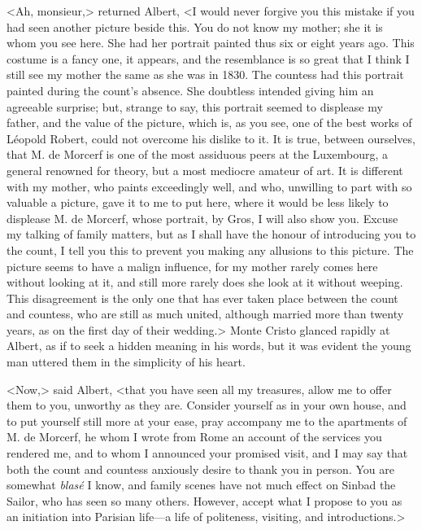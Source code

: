  <Ah, monsieur,> returned Albert, <I would never forgive you this mistake if you had seen another picture beside this. You do not know my mother; she it is whom you see here. She had her portrait painted thus six or eight years ago. This costume is a fancy one, it appears, and the resemblance is so great that I think I still see my mother the same as she was in 1830. The countess had this portrait painted during the count's absence. She doubtless intended giving him an agreeable surprise; but, strange to say, this portrait seemed to displease my father, and the value of the picture, which is, as you see, one of the best works of Léopold Robert, could not overcome his dislike to it. It is true, between ourselves, that M. de Morcerf is one of the most assiduous peers at the Luxembourg, a general renowned for theory, but a most mediocre amateur of art. It is different with my mother, who paints exceedingly well, and who, unwilling to part with so valuable a picture, gave it to me to put here, where it would be less likely to displease M. de Morcerf, whose portrait, by Gros, I will also show you. Excuse my talking of family matters, but as I shall have the honour of introducing you to the count, I tell you this to prevent you making any allusions to this picture. The picture seems to have a malign influence, for my mother rarely comes here without looking at it, and still more rarely does she look at it without weeping. This disagreement is the only one that has ever taken place between the count and countess, who are still as much united, although married more than twenty years, as on the first day of their wedding.>  Monte Cristo glanced rapidly at Albert, as if to seek a hidden meaning in his words, but it was evident the young man uttered them in the simplicity of his heart. 

 <Now,> said Albert, <that you have seen all my treasures, allow me to offer them to you, unworthy as they are. Consider yourself as in your own house, and to put yourself still more at your ease, pray accompany me to the apartments of M. de Morcerf, he whom I wrote from Rome an account of the services you rendered me, and to whom I announced your promised visit, and I may say that both the count and countess anxiously desire to thank you in person. You are somewhat \textit{blasé} I know, and family scenes have not much effect on Sinbad the Sailor, who has seen so many others. However, accept what I propose to you as an initiation into Parisian life—a life of politeness, visiting, and introductions.> 

